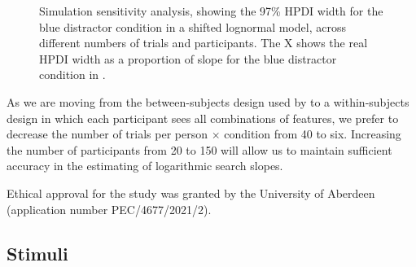 \documentclass[preprint,12pt,authoryear]{elsarticle}
\begin{document}
\begin{figure}
\centering
{}
\caption{Simulation sensitivity analysis, showing the 97\% HPDI width for the blue distractor condition in a shifted lognormal model, across different numbers of trials and participants. The X shows the real HPDI width as a proportion of slope for the blue distractor condition in \cite{buetti2019predicting}.}
\label{fig:power_plot}
\end{figure}

As we are moving from the between-subjects design used by \cite{buetti2019predicting} to a within-subjects design in which each participant sees all combinations of features, we prefer to decrease the number of trials per person $\times$ condition from 40 to six. Increasing the number of participants from 20 to 150 will allow us to maintain sufficient accuracy in the estimating of logarithmic search slopes. 

Ethical approval for the study was granted by the University of Aberdeen (application number PEC/4677/2021/2).

\subsection{Stimuli}
\end{document}
